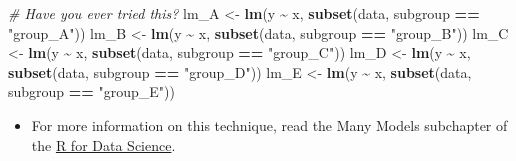 \documentclass[
]{book}
\newenvironment{Shaded}{\begin{snugshade}}{\end{snugshade}}
\newcommand{\AttributeTok}[1]{\textcolor[rgb]{0.13,0.29,0.53}{#1}}
\newcommand{\CommentTok}[1]{\textcolor[rgb]{0.56,0.35,0.01}{\textit{#1}}}
\newcommand{\ControlFlowTok}[1]{\textcolor[rgb]{0.13,0.29,0.53}{\textbf{#1}}}
\newcommand{\DecValTok}[1]{\textcolor[rgb]{0.00,0.00,0.81}{#1}}
\newcommand{\FunctionTok}[1]{\textcolor[rgb]{0.13,0.29,0.53}{\textbf{#1}}}
\newcommand{\NormalTok}[1]{#1}
\newcommand{\OtherTok}[1]{\textcolor[rgb]{0.56,0.35,0.01}{#1}}
\newcommand{\SpecialCharTok}[1]{\textcolor[rgb]{0.81,0.36,0.00}{\textbf{#1}}}
\newcommand{\StringTok}[1]{\textcolor[rgb]{0.31,0.60,0.02}{#1}}
\providecommand{\tightlist}{%
  \setlength{\itemsep}{0pt}\setlength{\parskip}{0pt}}
\begin{document}
\begin{Shaded}
\begin{Highlighting}[]
\CommentTok{\# Have you ever tried this?}
\NormalTok{lm\_A }\OtherTok{\textless{}{-}} \FunctionTok{lm}\NormalTok{(y }\SpecialCharTok{\textasciitilde{}}\NormalTok{ x, }\FunctionTok{subset}\NormalTok{(data, subgroup }\SpecialCharTok{==} \StringTok{"group\_A"}\NormalTok{))}
\NormalTok{lm\_B }\OtherTok{\textless{}{-}} \FunctionTok{lm}\NormalTok{(y }\SpecialCharTok{\textasciitilde{}}\NormalTok{ x, }\FunctionTok{subset}\NormalTok{(data, subgroup }\SpecialCharTok{==} \StringTok{"group\_B"}\NormalTok{))}
\NormalTok{lm\_C }\OtherTok{\textless{}{-}} \FunctionTok{lm}\NormalTok{(y }\SpecialCharTok{\textasciitilde{}}\NormalTok{ x, }\FunctionTok{subset}\NormalTok{(data, subgroup }\SpecialCharTok{==} \StringTok{"group\_C"}\NormalTok{))}
\NormalTok{lm\_D }\OtherTok{\textless{}{-}} \FunctionTok{lm}\NormalTok{(y }\SpecialCharTok{\textasciitilde{}}\NormalTok{ x, }\FunctionTok{subset}\NormalTok{(data, subgroup }\SpecialCharTok{==} \StringTok{"group\_D"}\NormalTok{))}
\NormalTok{lm\_E }\OtherTok{\textless{}{-}} \FunctionTok{lm}\NormalTok{(y }\SpecialCharTok{\textasciitilde{}}\NormalTok{ x, }\FunctionTok{subset}\NormalTok{(data, subgroup }\SpecialCharTok{==} \StringTok{"group\_E"}\NormalTok{))}
\end{Highlighting}
\end{Shaded}

\begin{itemize}
\tightlist
\item
  For more information on this technique, read the Many Models subchapter of the \href{https://r4ds.had.co.nz/many-models.html\#creating-list-columns}{R for Data Science}.
\end{itemize}

\begin{Shaded}
\end{Shaded}
\end{document}
